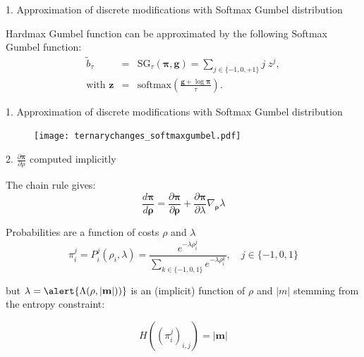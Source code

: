 \documentclass[10pt,aspectratio=169]{beamer}
\renewcommand{\vec}[1]{\mathbf{#1}}
\begin{document}
\begin{frame}{1. Approximation of discrete modifications with Softmax Gumbel distribution}
    
    \begin{tcolorbox}[colback=lightgreen,colframe=greentheme,title=\textbf{Definition} (Softmax Gumbel Function)]

        Hardmax Gumbel function can be approximated by the following Softmax Gumbel function: 
        \begin{eqnarray}\label{eq:softmaxgumbel} 
            \tilde{b}_{\tau} &=& \mbox{SG}_\tau(\bm{\pi}, \vec{g}) = \sum_{j \in \{-1,0,+1\}} j\;z^j,\\
            \text{with } \vec{z} &=& \mbox{softmax}\left(\frac{\vec{g}+\log \bm{\pi}}{\tau}\right).
        \end{eqnarray}

    \end{tcolorbox}

\end{frame}





\begin{frame}{1. Approximation of discrete modifications with Softmax Gumbel distribution}
    \begin{figure}[h]
        \texttt{[image: ternarychanges\_softmaxgumbel.pdf]}
    \end{figure}
\end{frame}



\begin{frame}{2. $\frac{\partial \mathbf{\pi}}{\partial \rho}$ computed implicitly}

    The chain rule gives:
    \begin{equation}
        \frac{d \bm{\pi}}{d \bm{\rho}} = \frac{\partial \bm{\pi}}{\partial \bm{\rho}} + \frac{\partial \bm{\pi}}{\partial \lambda} \nabla_{\bm{\rho}} \lambda
        \label{eq:gradientprobabilities}
    \end{equation}

    \pause
    Probabilities are a function of costs $\rho$ and $\lambda$
    \begin{equation}
        \pi_i^j = P_i^j\left(\rho_{i}, \lambda\right) =\frac{e^{-\lambda \rho_{i}^{j}}}{\sum_{k \in \{-1,0,1\}} e^{-\lambda \rho_{i}^{k}}}, \quad j \in \{-1, 0, 1\}
    \end{equation}
    
    \pause
    but $\lambda = \alert{\Lambda(\rho,|\mathbf{m}|))}$ is an (implicit) function of $\rho$ and $|m|$ stemming from the entropy constraint:
    
    \begin{equation}
        H\left(\left(\pi_i^j\right)_{i,j}\right)=|\mathbf{m}|
    \end{equation}

\end{frame}
\end{document}
